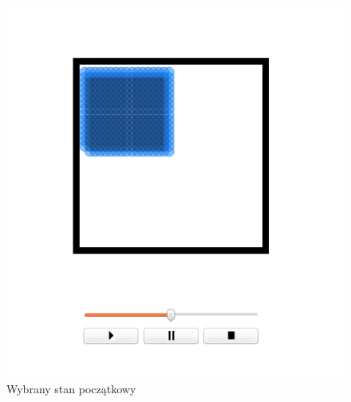 \begin{minipage}{0.5\textwidth}
\begin{figure}[H]
 \begin{center}
  \includegraphics[width=\textwidth]{./rysunki/poczatek}
 \end{center}
 \caption{Wybrany stan początkowy}
 \label{fig:poczatek}
\end{figure}
\end{minipage}\\[0.1cm]

